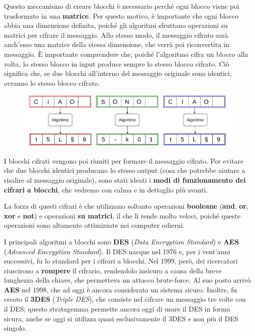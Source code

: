 \documentclass{rapport}
\begin{document}
Questo meccanismo di creare blocchi è necessario perché ogni blocco viene poi trasformato in una \textbf{matrice}. Per questo motivo, è importante che ogni blocco abbia una dimensione definita, poiché gli algoritmi sfruttano operazioni su matrici per cifrare il messaggio. Allo stesso modo, il messaggio cifrato sarà anch’esso una matrice della stessa dimensione, che verrà poi riconvertita in messaggio. È importante comprendere che, poiché l’algoritmo cifra un blocco alla volta, lo stesso blocco in input produce sempre lo stesso blocco cifrato. Ciò significa che, se due blocchi all’interno del messaggio originale sono identici, avranno lo stesso blocco cifrato.


\begin{figure}[h]
    \centering
    \includegraphics[width=\linewidth]{logos/0_7_cripto.pdf}
\end{figure}

I blocchi cifrati vengono poi riuniti per formare il messaggio cifrato. Per evitare che due blocchi identici producano lo stesso output (cosa che potrebbe aiutare a risalire al messaggio originale), sono stati ideati i \textbf{modi di funzionamento dei cifrari a blocchi}, che vedremo con calma e in dettaglio più avanti.

\newpage

La forza di questi cifrari è che utilizzano soltanto operazioni \textbf{booleane} (\textbf{and}, \textbf{or}, \textbf{xor} e \textbf{not}) e operazioni \textbf{su matrici}, il che li rende molto veloci, poiché queste operazioni sono altamente ottimizzate nei computer odierni.


I principali algoritmi a blocchi sono \textbf{DES} (\textit{Data Encryption Standard}) e \textbf{AES} (\textit{Advanced Encryption Standard}). Il DES nacque nel 1976 e, per i vent’anni successivi, fu lo standard per i cifrari a blocchi. Nel 1999, però, dei ricercatori riuscirono a \textbf{rompere} il cifrario, rendendolo insicuro a causa della breve lunghezza della chiave, che permetteva un attacco brute-force. Al suo posto arrivò \textbf{AES} nel 1998, che ad oggi è ancora considerato un sistema sicuro. Inoltre, fu creato il \textbf{3DES} (\textit{Triple DES}), che consiste nel cifrare un messaggio tre volte con il DES; questo stratagemma permette ancora oggi di usare il DES in forma sicura, anche se oggi si utilizza quasi esclusivamente il 3DES e non più il DES singolo.
\end{document}
